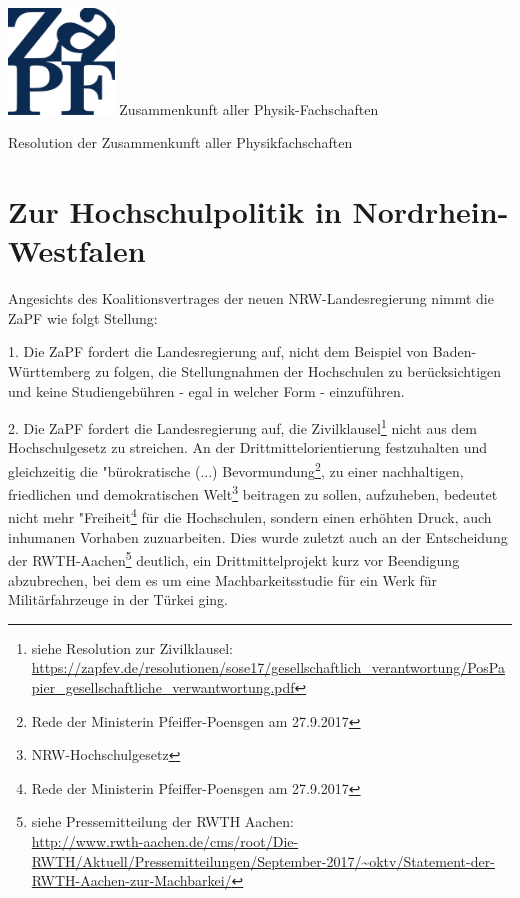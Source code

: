 \documentclass[DIV=calc]{scrartcl}
\begin{document}
    \hspace{0.87\textwidth}
    \begin{minipage}{120pt}
        \vspace{-1.8cm}
        \includegraphics[width=80pt]{../../logo.pdf}
        \centering
        \small Zusammenkunft aller Physik-Fachschaften
    \end{minipage}
    \begin{center}
        \huge{Resolution der Zusammenkunft aller Physikfachschaften}\vspace{.25\baselineskip}\\
        \normalsize
    \end{center}
    \vspace{0cm}   


\section*{Zur Hochschulpolitik in Nordrhein-Westfalen}

Angesichts des Koalitionsvertrages der neuen NRW-Landesregierung nimmt die ZaPF wie folgt Stellung:

1. Die ZaPF fordert die Landesregierung auf, nicht dem Beispiel von Baden-Württem\-berg zu folgen, die Stellungnahmen der Hochschulen zu berücksichtigen und keine Studiengebühren - egal in welcher Form - einzuführen.

2. Die ZaPF fordert die Landesregierung auf, die Zivilklausel\footnote{siehe Resolution zur Zivilklausel:\\ \url{https://zapfev.de/resolutionen/sose17/gesellschaftlich_verantwortung/PosPapier_gesellschaftliche_verwantwortung.pdf}} nicht aus dem Hochschulgesetz zu streichen.
An der Drittmittelorientierung festzuhalten und gleichzeitig die "bürokratische (...) Bevormundung\grqq\footnote{Rede der Ministerin Pfeiffer-Poensgen am 27.9.2017}, \grqq zu einer nachhaltigen, friedlichen und demokratischen Welt\grqq\footnote{NRW-Hochschulgesetz} beitragen zu sollen, aufzuheben, bedeutet nicht mehr "Freiheit\grqq\footnote{Rede der Ministerin Pfeiffer-Poensgen am 27.9.2017} für die Hochschulen, sondern einen erhöhten Druck, auch inhumanen Vorhaben zuzuarbeiten.
Dies wurde zuletzt auch an der Entscheidung der RWTH-Aachen\footnote{siehe Pressemitteilung der RWTH Aachen:\\ \url{http://www.rwth-aachen.de/cms/root/Die-RWTH/Aktuell/Pressemitteilungen/September-2017/~oktv/Statement-der-RWTH-Aachen-zur-Machbarkei/}} deutlich, ein Drittmittelprojekt kurz vor Beendigung abzubrechen, bei dem es um eine Machbarkeitsstudie für ein Werk für Militärfahrzeuge in der Türkei ging.
\end{document}
